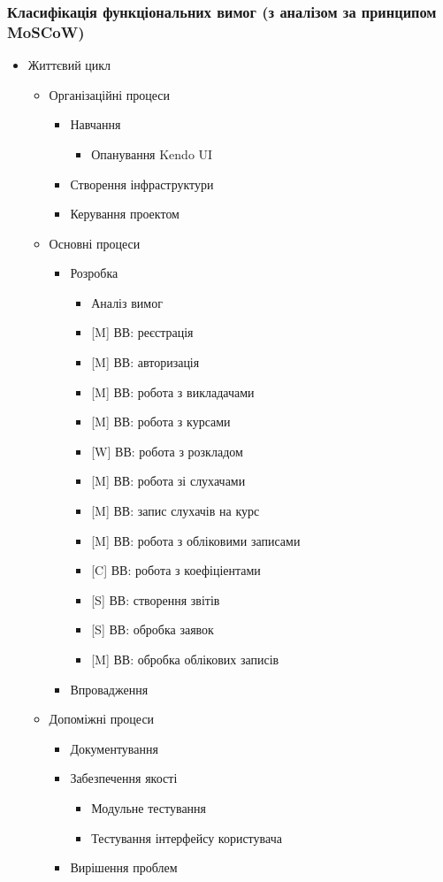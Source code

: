 \begin{description}
\subsubsection*{Класифікація функціональних вимог (з аналізом за принципом MoSCoW)}
\begin{itemize}
 \item Життєвий цикл
 \begin{itemize}
  \item Організаційні процеси
  \begin{itemize}
   \item Навчання
   \begin{itemize}
    \item Опанування Kendo UI
   \end{itemize}
   \item Створення інфраструктури
   \item Керування проектом
  \end{itemize}
  \item Основні процеси
  \begin{itemize}
   \item Розробка
   \begin{itemize}
    \item Аналіз вимог
    \item {[}M{]} ВВ: реєстрація
    \item {[}M{]} ВВ: авторизація
    \item {[}M{]} ВВ: робота з викладачами
    \item {[}M{]} ВВ: робота з курсами
    \item {[}W{]} ВВ: робота з розкладом
    \item {[}M{]} ВВ: робота зі слухачами
    \item {[}M{]} ВВ: запис слухачів на курс
    \item {[}M{]} ВВ: робота з обліковими записами
    \item {[}C{]} ВВ: робота з коефіціентами
    \item {[}S{]} ВВ: створення звітів
    \item {[}S{]} ВВ: обробка заявок
    \item {[}M{]} ВВ: обробка облікових записів
   \end{itemize}
   \item Впровадження
  \end{itemize}
  \item Допоміжні процеси
  \begin{itemize}
   \item Документування
   \item Забезпечення якості
   \begin{itemize}
    \item Модульне тестування
    \item Тестування інтерфейсу користувача
   \end{itemize}
   \item Вирішення проблем
  \end{itemize}
 \end{itemize}
\end{itemize}
\end{description}

